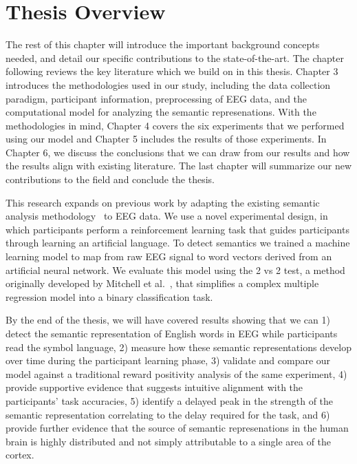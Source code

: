 \section{Thesis Overview}

The rest of this chapter will introduce the important background concepts 
needed, and detail our specific contributions to the state-of-the-art. The 
chapter following reviews the key literature which we build on in this thesis.  
Chapter 3 introduces the methodologies used in our study, including the data 
collection paradigm, participant information, preprocessing of EEG data, and 
the computational model for analyzing the semantic represenations. With the 
methodologies in mind, Chapter 4 covers the six experiments that we performed 
using our model and Chapter 5 includes the results of those experiments. In 
Chapter 6, we discuss the conclusions that we can draw from our results and how 
the results align with existing literature. The last chapter will summarize our 
new contributions to the field and conclude the thesis.

This research expands on previous work by adapting the existing semantic 
analysis methodology~\cite{Mitchell2008,Sudre2012} to EEG data.  We use a novel 
experimental design, in which participants perform a reinforcement learning 
task that guides participants through learning an artificial language. To 
detect semantics we trained a machine learning model to map from raw EEG signal 
to word vectors derived from an artificial neural network. We evaluate this 
model using the 2 vs 2 test, a method originally developed by Mitchell et 
al.~\cite{Mitchell2008}, that simplifies a complex multiple regression model 
into a binary classification task.

By the end of the thesis, we will have covered results showing that we can 1) 
detect the semantic representation of English words in EEG while participants 
read the symbol language, 2) measure how these semantic representations develop 
over time during the participant learning phase, 3) validate and compare our 
model against a traditional reward positivity analysis of the same experiment, 
4) provide supportive evidence that suggests intuitive alignment with the 
participants' task accuracies, 5) identify a delayed peak in the strength of 
the semantic representation correlating to the delay required for the task, and 
6) provide further evidence that the source of semantic represenations in the 
human brain is highly distributed and not simply attributable to a single area 
of the cortex.
